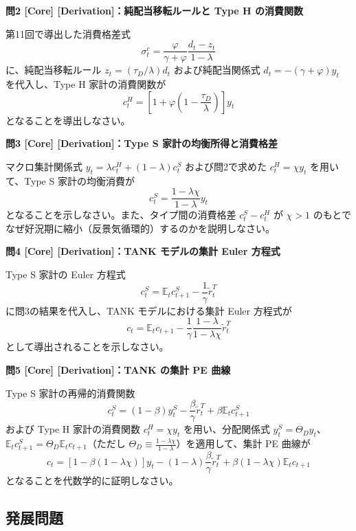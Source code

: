 \documentclass[
  japanese,
  lualatex,
  ja=standard,
  12pt,
  a4paper]{ltjsarticle}
\begin{document}

\textbf{問2 {[}Core{]} {[}Derivation{]}：純配当移転ルールと Type H
の消費関数}

第11回で導出した消費格差式 \[
\sigma_t^c = \frac{\varphi}{\gamma+\varphi} \frac{d_t - z_t}{1-\lambda}
\] に、純配当移転ルール \(z_t = (\tau_D / \lambda) d_t\)
および純配当関係式 \(d_t = -(\gamma+\varphi)y_t\) を代入し、Type H
家計の消費関数が \[
c_t^H = \left[ 1 + \varphi\left( 1 - \frac{\tau_D}{\lambda} \right) \right] y_t
\] となることを導出しなさい。


\textbf{問3 {[}Core{]} {[}Derivation{]}：Type S
家計の均衡所得と消費格差}

マクロ集計関係式 \(y_t = \lambda c_t^H + (1-\lambda) c_t^S\)
および問2で求めた \(c_t^H = \chi y_t\) を用いて、Type S 家計の均衡消費が
\[
c_t^S = \frac{1 - \lambda\chi}{1-\lambda} y_t
\] となることを示しなさい。また、タイプ間の消費格差 \(c_t^S - c_t^H\) が
\(\chi > 1\)
のもとでなぜ好況期に縮小（反景気循環的）するのかを説明しなさい。


\textbf{問4 {[}Core{]} {[}Derivation{]}：TANK モデルの集計 Euler 方程式}

Type S 家計の Euler 方程式 \[
c_t^S = \mathbb{E}_t c_{t+1}^S - \frac{1}{\gamma}\widetilde{r}_t^T
\] に問3の結果を代入し、TANK モデルにおける集計 Euler 方程式が \[
c_t = \mathbb{E}_t c_{t+1} - \frac{1}{\gamma} \frac{1-\lambda}{1-\lambda\chi}\widetilde{r}_t^T
\] として導出されることを示しなさい。


\textbf{問5 {[}Core{]} {[}Derivation{]}：TANK の集計 PE 曲線}

Type S 家計の再帰的消費関数 \[
c_t^S = (1-\beta)y_t^S - \frac{\beta}{\gamma}\widetilde{r}_t^T + \beta \mathbb{E}_t c_{t+1}^S
\] および Type H 家計の消費関数 \(c_t^H = \chi y_t\) を用い、分配関係式
\(y_t^S = \Theta_D y_t\)、\(\mathbb{E}_t c_{t+1}^S = \Theta_D \mathbb{E}_t c_{t+1}\)（ただし
\(\Theta_D \equiv \frac{1-\lambda\chi}{1-\lambda}\)）を適用して、集計 PE
曲線が \[
c_t = [1 - \beta(1 - \lambda\chi)] y_t - (1-\lambda)\frac{\beta}{\gamma}\widetilde{r}_t^T + \beta(1 - \lambda\chi)\mathbb{E}_t c_{t+1}
\] となることを代数学的に証明しなさい。

\subsection{発展問題}\label{ux767aux5c55ux554fux984c}
\end{document}
